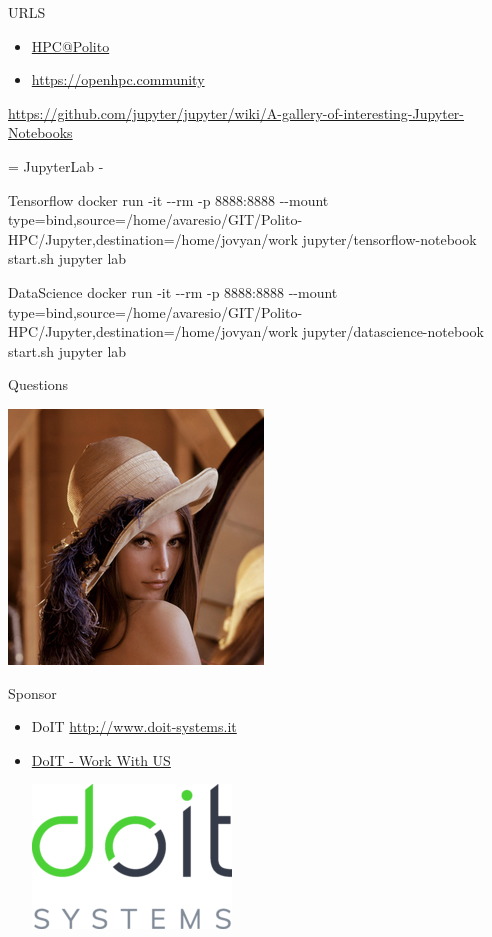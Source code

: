 \documentclass[ignorenonframetext,]{beamer}
\providecommand{\tightlist}{%
  \setlength{\itemsep}{0pt}\setlength{\parskip}{0pt}}
\begin{document}
\begin{frame}{URLS}

\begin{itemize}
\tightlist
\item
  \href{http://hpc.polito.it/}{HPC@Polito}
\end{itemize}


\begin{itemize}
\tightlist
\item
  \url{https://openhpc.community}
\end{itemize}

\url{https://github.com/jupyter/jupyter/wiki/A-gallery-of-interesting-Jupyter-Notebooks}

= JupyterLab -

Tensorflow docker run -it -\/-rm -p 8888:8888 -\/-mount
type=bind,source=/home/avaresio/GIT/Polito-HPC/Jupyter,destination=/home/jovyan/work
jupyter/tensorflow-notebook start.sh jupyter lab

DataScience docker run -it -\/-rm -p 8888:8888 -\/-mount
type=bind,source=/home/avaresio/GIT/Polito-HPC/Jupyter,destination=/home/jovyan/work
jupyter/datascience-notebook start.sh jupyter lab

\end{frame}

\begin{frame}{Questions}

\includegraphics{images/Lenna.png}

\end{frame}

\begin{frame}{Sponsor}

\begin{itemize}
\item
  DoIT \href{http://www.doit-systems.it/}{http://www.doit-systems.it}
\item
  \href{http://www.doit-systems.it/EN_lavoraconnoi.html}{DoIT - Work
  With US}

  \includegraphics{images/DoIT.png}
\end{itemize}


\end{frame}
\end{document}
